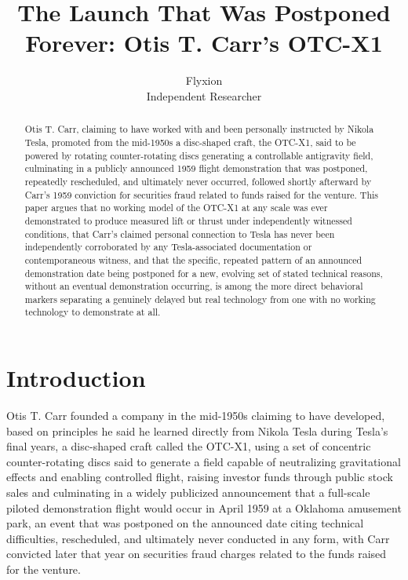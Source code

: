 \documentclass[11pt]{article}
\title{The Launch That Was Postponed Forever: Otis T. Carr's OTC-X1}
\author{Flyxion \\ \small Independent Researcher}
\date{}
\begin{document}
\maketitle

\begin{abstract}
Otis T. Carr, claiming to have worked with and been personally instructed by Nikola Tesla, promoted from the mid-1950s a disc-shaped craft, the OTC-X1, said to be powered by rotating counter-rotating discs generating a controllable antigravity field, culminating in a publicly announced 1959 flight demonstration that was postponed, repeatedly rescheduled, and ultimately never occurred, followed shortly afterward by Carr's 1959 conviction for securities fraud related to funds raised for the venture. This paper argues that no working model of the OTC-X1 at any scale was ever demonstrated to produce measured lift or thrust under independently witnessed conditions, that Carr's claimed personal connection to Tesla has never been independently corroborated by any Tesla-associated documentation or contemporaneous witness, and that the specific, repeated pattern of an announced demonstration date being postponed for a new, evolving set of stated technical reasons, without an eventual demonstration occurring, is among the more direct behavioral markers separating a genuinely delayed but real technology from one with no working technology to demonstrate at all.
\end{abstract}

\section{Introduction}

Otis T. Carr founded a company in the mid-1950s claiming to have developed, based on principles he said he learned directly from Nikola Tesla during Tesla's final years, a disc-shaped craft called the OTC-X1, using a set of concentric counter-rotating discs said to generate a field capable of neutralizing gravitational effects and enabling controlled flight, raising investor funds through public stock sales and culminating in a widely publicized announcement that a full-scale piloted demonstration flight would occur in April 1959 at a Oklahoma amusement park, an event that was postponed on the announced date citing technical difficulties, rescheduled, and ultimately never conducted in any form, with Carr convicted later that year on securities fraud charges related to the funds raised for the venture.
\end{document}
